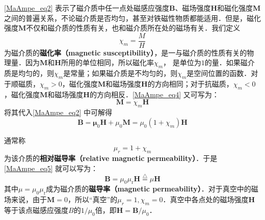 \autoref{MaAmpe_eq2} 表示了磁介质中任一点处磁感应强度$\mathbf B$、磁场强度$\mathbf H$和磁化强度$\mathbf M $之间的普遍关系，不论磁介质是否均匀，甚至对铁磁性物质都能适用．但是，磁化强度$\mathbf M $不仅和磁介质的性质有关，也和磁介质所在处的磁场有关．我们定义
\begin{equation} \label{MaAmpe_eq4}
\chi_{m}=\frac{M}{H}
\end{equation}
为磁介质的\textbf{磁化率（magnetic susceptibility）}，是一与磁介质的性质有关的物理量．因为$\mathbf M $和$\mathbf H $所用的单位相同，所以磁化率$\chi_m$， 是单位为$1 $的量．如果磁介质是均匀的，则$\chi_m$是常量；如果磁介质是不均匀的，则$\chi_m$是空间位置的函数．对于顺磁质，$\chi_m>0$，磁化强度$\mathbf M $和磁场强度$\mathbf H $的方向相同；对于抗磁质，$\chi_m<0$，磁化强度$\mathbf M $和磁场强度$\mathbf H $的方向相反．\autoref{MaAmpe_eq4} 又可写为：
\begin{equation} \label{MaAmpe_eq5}
\mathbf M = \chi_m\mathbf H
\end{equation}
将其代入\autoref{MaAmpe_eq2} 中可解得
\begin{equation}
\mathbf{B}=\mathbf{\mu}_{0} \mathbf{H}+\mu_{0} \mathbf{M}=\mu_{0}\left(1+\chi_{{m}}\right) \mathbf{H}
\end{equation}

通常称
\begin{equation}
\mu_{{r}}=1+\chi_{m}
\end{equation}
为该介质的\textbf{相对磁导率（relative magnetic permeability）}．于是\autoref{MaAmpe_eq5} 就可以写为：
\begin{equation}
\mathbf B=\mu_{0} \mu_{\mathrm{r}} \mathbf H\overset{\triangle}=\mu \mathbf H
\end{equation}
其中$\mu = \mu_{0} \mu_{\mathrm{r}} $成为磁介质的\textbf{磁导率（magnetic permeability）}．对于真空中的磁场来说，由于$\mathbf M=0$，所以“真空”的$\mu_r=1,\chi_m=0$．真空中各点处的磁场强度$\mathbf H $等于该点磁感应强度$B $的$1/\mu_0$倍，即$\mathbf H = \mathbf B / \mu_0$．